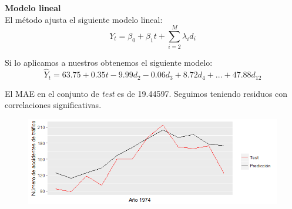 \documentclass[10pt,a4paper,twoside]{beamer}
\begin{document}

\begin{frame}
\textbf{Modelo lineal}\\
El método  ajusta el siguiente modelo lineal:\\
\begin{equation*}
    Y_{t} = \beta_0 + \beta_1 t + \sum_{i = 2}^{M} \lambda_i d_i
\end{equation*}

Si lo aplicamos a nuestros obtenemos el siguiente modelo:\\
\begin{equation*}
    \widehat{Y}_{t} = 63.75 + 0.35 t - 9.99 d_2 - 0.06 d_3 + 8.72 d_4 + ... + 47.88 d_{12}
\end{equation*}

El MAE en el conjunto de \textit{test} es de 19.44597. Seguimos teniendo residuos con correlaciones significativas.\\

\begin{figure}
    \centering
    \centerline{\includegraphics[scale = 0.5]{Images/312.png}}
\end{figure}

\end{frame}

\end{document}
